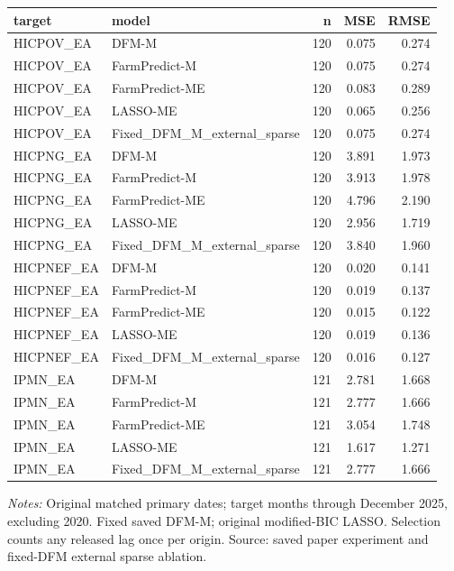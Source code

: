 \begin{threeparttable}
\begin{tabular}{llrrr}
\toprule
target & model & n & MSE & RMSE \\
\midrule
HICPOV\_EA & DFM-M & 120 & 0.075 & 0.274 \\
HICPOV\_EA & FarmPredict-M & 120 & 0.075 & 0.274 \\
HICPOV\_EA & FarmPredict-ME & 120 & 0.083 & 0.289 \\
HICPOV\_EA & LASSO-ME & 120 & 0.065 & 0.256 \\
HICPOV\_EA & Fixed\_DFM\_M\_external\_sparse & 120 & 0.075 & 0.274 \\
HICPNG\_EA & DFM-M & 120 & 3.891 & 1.973 \\
HICPNG\_EA & FarmPredict-M & 120 & 3.913 & 1.978 \\
HICPNG\_EA & FarmPredict-ME & 120 & 4.796 & 2.190 \\
HICPNG\_EA & LASSO-ME & 120 & 2.956 & 1.719 \\
HICPNG\_EA & Fixed\_DFM\_M\_external\_sparse & 120 & 3.840 & 1.960 \\
HICPNEF\_EA & DFM-M & 120 & 0.020 & 0.141 \\
HICPNEF\_EA & FarmPredict-M & 120 & 0.019 & 0.137 \\
HICPNEF\_EA & FarmPredict-ME & 120 & 0.015 & 0.122 \\
HICPNEF\_EA & LASSO-ME & 120 & 0.019 & 0.136 \\
HICPNEF\_EA & Fixed\_DFM\_M\_external\_sparse & 120 & 0.016 & 0.127 \\
IPMN\_EA & DFM-M & 121 & 2.781 & 1.668 \\
IPMN\_EA & FarmPredict-M & 121 & 2.777 & 1.666 \\
IPMN\_EA & FarmPredict-ME & 121 & 3.054 & 1.748 \\
IPMN\_EA & LASSO-ME & 121 & 1.617 & 1.271 \\
IPMN\_EA & Fixed\_DFM\_M\_external\_sparse & 121 & 2.777 & 1.666 \\
\bottomrule
\end{tabular}
\begin{tablenotes}[flushleft]\footnotesize
\item \textit{Notes:} Original matched primary dates; target months through December 2025, excluding 2020. Fixed saved DFM-M; original modified-BIC LASSO. Selection counts any released lag once per origin. Source: saved paper experiment and fixed-DFM external sparse ablation.
\end{tablenotes}
\end{threeparttable}
